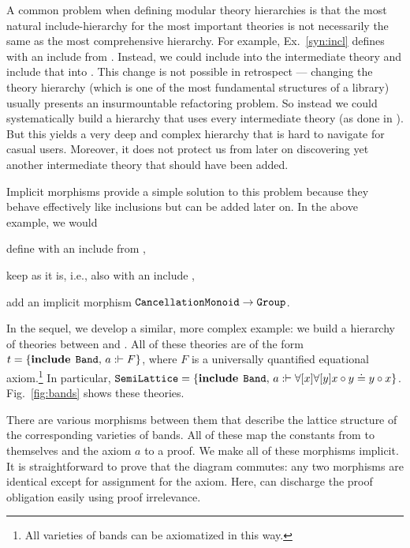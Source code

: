 A common problem when defining modular theory hierarchies is that the most natural include-hierarchy for the most important theories is not necessarily the same as the most comprehensive hierarchy.
For example, Ex.~\ref{syn:incl} defines  with an include from .
Instead, we could include  into the intermediate theory  and include that into .
This change is not possible in retrospect --- changing the theory hierarchy (which is one of the most fundamental structures of a library) usually presents an insurmountable refactoring problem.
So instead we could systematically build a hierarchy that uses every intermediate theory (as done in \cite{mathscheme}).
But this yields a very deep and complex hierarchy that is hard to navigate for casual users.
Moreover, it does not protect us from later on discovering yet another intermediate theory that should have been added.

Implicit morphisms provide a simple solution to this problem because they behave effectively like inclusions but can be added later on.
In the above example, we would
\begin{compactitem}
 \item define  with an include from ,
 \item keep  as it is, i.e., also with an include ,
 \item add an implicit morphism $\operatorname{\mathtt{CancellationMonoid}}\to\operatorname{\mathtt{Group}}$.
\end{compactitem}

In the sequel, we develop a similar, more complex example: we build a hierarchy of theories between  and .
All of these theories are of the form $t=\{\operatorname{\mathbf{include}}{\;\operatorname{\mathtt{Band}}},\,a:\vdash F\}$, where $F$ is a universally quantified equational axiom.\footnote{All varieties of bands can be axiomatized in this way.}
In particular, $\operatorname{\mathtt{SemiLattice}}=\{\operatorname{\mathbf{include}}{\;\operatorname{\mathtt{Band}}},\,a:\vdash \forall [x]\forall [y] x\circ y\doteq y\circ x\}$.
Fig.~\ref{fig:bands} shows these theories.

There are various morphisms between them that describe the lattice structure of the corresponding varieties of bands.
All of these map the constants from  to themselves and the axiom $a$ to a proof.
We make all of these morphisms implicit.
It is straightforward to prove that the diagram commutes: any two morphisms are identical except for assignment for the axiom.
Here, \mmt can discharge the proof obligation easily using proof irrelevance.

